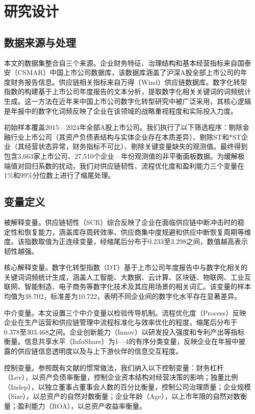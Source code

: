 \section{研究设计}

\subsection{数据来源与处理}

本文的数据集整合自三个来源。企业财务特征、治理结构和基本经营指标来自国泰安（CSMAR）中国上市公司数据库，该数据库涵盖了沪深A股全部上市公司的年度财务报告信息。供应链相关指标来自万得（Wind）供应链数据库。数字化转型指数的构建基于上市公司年度报告的文本分析，提取数字化相关关键词的词频统计生成。这一方法在近年来中国上市公司数字化转型研究中被广泛采用，其核心逻辑是年报中的数字化词频反映了企业在该领域的战略重视程度和实际投入力度。

初始样本覆盖2015—2024年全部A股上市公司。我们执行了以下筛选程序：剔除金融行业上市公司（其资产负债表结构与实体企业存在本质差异）、剔除ST和*ST企业（其经营状态异常，财务指标不可比）、剔除关键变量缺失的观测值。最终得到包含3,663家上市公司、27,510个企业—年份观测值的非平衡面板数据。为缓解极端值对回归系数的扰动，我们对供应链韧性、流程优化度和盈利能力三个变量在1\%和99\%分位数上进行了缩尾处理。

\subsection{变量定义}

被解释变量。供应链韧性（SCR）综合反映了企业在面临供应链中断冲击时的稳定性和恢复能力，涵盖库存周转效率、供应商集中度规避和供应中断恢复周期等维度。该指数取值为正连续变量，经缩尾后分布于0.233至3.298之间，数值越高表示韧性越强。

核心解释变量。数字化转型指数（DT）基于上市公司年度报告中与数字化相关的关键词词频统计生成，涵盖人工智能、大数据、云计算、区块链、物联网、工业互联网、智能制造、电子商务等数字化技术及其应用场景的相关词汇。该变量的样本均值为38.702，标准差为10.722，表明不同企业间的数字化水平存在显著差异。

中介变量。本文设置三个中介变量以检验传导机制。流程优化度（Process）反映企业在生产运营和供应链管理中流程标准化与效率优化的程度，缩尾后分布于0.378至303.468之间。企业创新能力（Innov）以研发投入强度和专利产出等指标衡量。信息共享水平（InfoShare）为1—4的有序分类变量，反映企业在年报中披露的供应链信息透明度以及与上下游伙伴的信息交互程度。

控制变量。参照既有文献的惯常做法，我们纳入以下控制变量：财务杠杆（Lev），以资产负债率衡量，控制企业资本结构对经营决策的影响；独董比例（Indep），以独立董事占董事会人数的百分比衡量，控制公司治理质量；企业规模（Size），以总资产的自然对数衡量；企业年龄（Age），以上市年限的自然对数衡量；盈利能力（ROA），以总资产收益率衡量。

